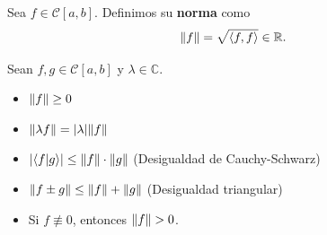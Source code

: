 \begin{defi}
Sea $f \in \mathcal{C}[a,b]$. Definimos su \textbf{norma} como
$$\lVert f\rVert = \sqrt{\langle f,f \rangle} \in \mathbb{R}.$$
\end{defi}

\begin{propo}
Sean $f,g \in \mathcal{C}[a,b]$ y $\lambda \in \mathbb{C}$.

\begin{itemize}
    \item $\lVert f\rVert \geq 0$
    \item $\lVert\lambda f\rVert = |\lambda| \lVert f\rVert$
    \item $|\langle f| g \rangle | \leq \lVert f\rVert \cdot \lVert g\rVert$ (Desigualdad de Cauchy-Schwarz)
    \item $\lVert f \pm g\rVert \leq \lVert f\rVert + \lVert g\rVert$ (Desigualdad triangular)
    \item Si $f \not\equiv 0$, entonces $\lVert f\rVert > 0$.
\end{itemize}
\end{propo}


